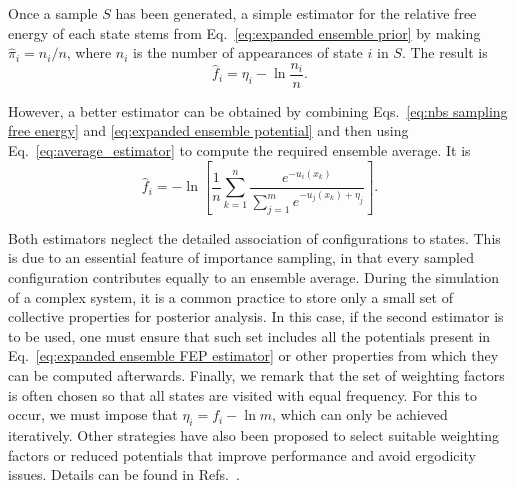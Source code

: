 \documentclass[aip,jcp,reprint,amsmath,amssymb]{revtex4-1}
\begin{document}
Once a sample $S$ has been generated, a simple estimator for the relative free energy of each state stems from Eq.~\eqref{eq:expanded ensemble prior} by making $\hat \pi_i = n_i/n$, where $n_i$ is the number of appearances of state $i$ in $S$. The result is
\begin{equation}
\hat f_i = \eta_i - \ln \frac{n_i}{n}.
\end{equation}

However, a better estimator can be obtained by combining Eqs.~\eqref{eq:nbs sampling free energy} and \eqref{eq:expanded ensemble potential} and then using Eq.~\eqref{eq:average_estimator} to compute the required ensemble average. It is
\begin{equation}
\hat f_i = -\ln \left[ \frac{1}{n}\sum_{k=1}^n \frac{e^{-u_i(x_k)}}{\sum_{j=1}^m e^{-u_j(x_k) + \eta_j}} \right].
\end{equation}

Both estimators neglect the detailed association of configurations to states. This is due to an essential feature of importance sampling, in that every sampled configuration contributes equally to an ensemble average. During the simulation of a complex system, it is a common practice to store only a small set of collective properties for posterior analysis. In this case, if the second estimator is to be used, one must ensure that such set includes all the potentials present in Eq.~\eqref{eq:expanded ensemble FEP estimator} or other properties from which they can be computed afterwards. Finally, we remark that the set of weighting factors is often chosen so that all states are visited with equal frequency. For this to occur, we must impose that $\eta_i = f_i - \ln m$, which can only be achieved iteratively. Other strategies have also been proposed to select suitable weighting factors or reduced potentials that improve performance and avoid ergodicity issues. Details can be found in Refs.~.



\end{document}
